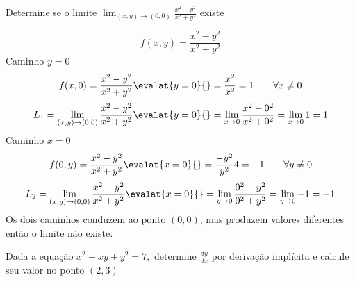 \documentclass[a4paper,12pt,fleqn]{article}
\begin{document}
  Determine se o limite
  \(
    \lim_{(x, y)\to(0, 0)} \frac{x^2-y^2}{x^2+y^2}
  \)
  existe

\begin{answer}
  \[
    f(x, y) = \frac{x^2-y^2}{x^2+y^2}
  \]
  Caminho $y=0$
  \[
    f(x, 0)
    = \frac{x^2-y^2}{x^2+y^2} \evalat{y=0}{}
    = \frac{x^2}{x^2}
    = 1
    \qquad\forall x\neq 0
  \]
  \[
    L_1
    = \lim_{(x, y)\to(0, 0)} \frac{x^2-y^2}{x^2+y^2} \evalat{y=0}{}
    = \lim_{x \to 0} \frac{x^2-0^2}{x^2+0^2}
    = \lim_{x \to 0} 1
    = 1
  \]
  Caminho $x = 0$
  \[
    f(0, y)
    = \frac{x^2-y^2}{x^2+y^2} \evalat{x=0}{}
    = \frac{-y^2}{y^2} 4
    = -1
    \qquad\forall y\neq 0
  \]
  \[
    L_2
    = \lim_{(x, y)\to(0, 0)} \frac{x^2-y^2}{x^2+y^2} \evalat{x=0}{}
    = \lim_{y \to 0} \frac{0^2-y^2}{0^2+y^2}
    = \lim_{y \to 0} -1
    = -1
  \]
  Os dois caminhos conduzem ao ponto $(0, 0)$,
  mas produzem valores diferentes então o limite não existe.
\end{answer}

Dada a equação
\(
  x^2 + xy + y^2 = 7,
\)
determine \(\frac{dy}{dx}\) por derivação implícita e calcule seu valor no ponto $(2, 3)$
\end{document}
